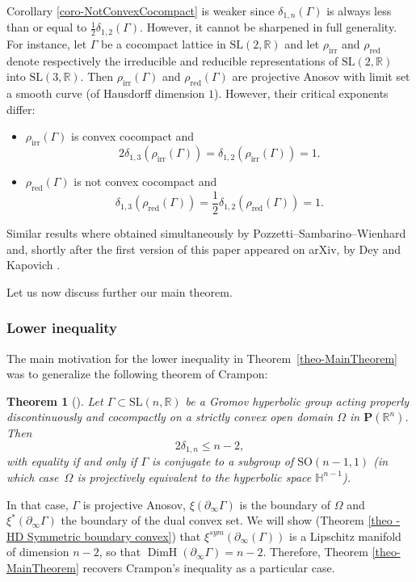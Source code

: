 \documentclass[JEP,XML,SOM,Unicode,NoEqCountersInSection,NoFloatCountersInSection,published]{cedram}
\newcommand{\irr}{\mathrm{irr}}
\newcommand{\red}{\mathrm{red}}
\newtheorem{theo}{Theorem}[section]
\theoremstyle{definition}
\newcommand{\proj}{\mathbf{P}}
\newcommand{\R}{\mathbb{R}}
\newcommand{\Hyp}{\mathbb{H}}
\newcommand{\SL}{\mathrm{SL}}
\newcommand{\SO}{\mathrm{SO}}
\DeclareMathOperator{\DimH}{DimH}
\let\G\Gamma
\begin{document}
Corollary \ref{coro-NotConvexCocompact} is weaker since $\delta_{1,n}(\Gamma)$ is always less than or equal to $\frac{1}{2} \delta_{1,2}(\G)$. However, it cannot be sharpened in full generality. For instance, let $\Gamma$ be a cocompact lattice in $\SL(2,\R)$ and let $\rho_{\irr}$ and $\rho_{\red}$ denote respectively the irreducible and redu\-cible representations of $\SL(2,\R)$ into $\SL(3,\R)$. Then $\rho_{\irr}(\Gamma)$ and $\rho_{\red}(\Gamma)$ are projective Anosov with limit set a smooth curve (of Hausdorff dimension $1$). However, their critical exponents differ:
\begin{itemize}
\item $\rho_{\irr}(\Gamma)$ is convex cocompact and
\[2\delta_{1,3}(\rho_{\irr}(\G)) = \delta_{1,2}(\rho_{\irr}(\G)) = 1.\]
\item $\rho_{\red}(\Gamma)$ is not convex cocompact and
\[\delta_{1,3}(\rho_{\red}(\G)) = \frac{1}{2} \delta_{1,2}(\rho_{\red}(\G)) = 1.\]
\end{itemize}

Similar results where obtained simultaneously by Pozzetti--Sambarino--Wienhard \cite{PSW19} and, shortly after the first version of this paper appeared on arXiv, by Dey and Kapovich \cite{DeyKapovich}.

Let us now discuss further our main theorem.

\subsubsection*{Lower inequality}

The main motivation for the lower inequality in Theorem~\ref{theo-MainTheorem} was to generalize the following theorem of Crampon:

\begin{theo}[\cite{crampon2011dynamics}]
Let $\G \subset \SL(n,\R)$ be a Gromov hyperbolic group acting properly discontinuously and cocompactly on a strictly convex open domain $\Omega$ in $\proj(\R^n)$. Then
\[2\delta_{1,n} \leq n-2,\]
with equality if and only if $\Gamma$ is conjugate to a subgroup of $\SO(n-1,1)$ (in which case~$\Omega$ is projectively equivalent to the hyperbolic space $\Hyp^{n-1}$).
\end{theo}

In that case, $\Gamma$ is projective Anosov, $\xi(\partial_\infty \G)$ is the boundary of $\Omega$ and $\xi^*(\partial_\infty \G)$ the boundary of the dual convex set. We will show (Theorem \ref{theo - HD Symmetric boundary convex}) that $\xi^{\textit{sym}}(\partial_\infty(\G))$ is a Lipschitz manifold of dimension $n-2$, so that $\DimH(\partial_\infty \G) = n-2$. Therefore, Theorem \ref{theo-MainTheorem} recovers Crampon's inequality as a particular case.
\end{document}
